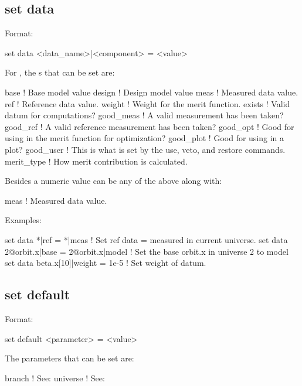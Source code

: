 {{\subsection{set data}
\label{s:set.data}

Format:
\begin{example}
  set data <data_name>|<component> = <value>
\end{example}


For , the s that can be set are:
\begin{example}
  base        ! Base model value
  design      ! Design model value
  meas        ! Measured data value.
  ref         ! Reference data value.
  weight      ! Weight for the merit function.
  exists      ! Valid datum for computations?
  good_meas   ! A valid measurement has been taken?
  good_ref    ! A valid reference measurement has been taken?
  good_opt    ! Good for using in the merit function for optimization?
  good_plot   ! Good for using in a plot?
  good_user   ! This is what is set by the use, veto, and restore commands.
  merit_type  ! How merit contribution is calculated.
\end{example}
Besides a numeric value  can be any of the above along with:
\begin{example}
  meas        ! Measured data value.
\end{example}

Examples:
\begin{example}
  set data *|ref = *|meas            ! Set ref data = measured in current universe.
  set data 2@orbit.x|base = 2@orbit.x|model 
                                     ! Set the base orbit.x in universe 2 to model
  set data beta.x[10]|weight = 1e-5  ! Set weight of datum.
\end{example}


\subsection{set default}
\label{s:set.default}

Format:
\begin{example}
  set default <parameter> = <value>
\end{example}

The parameters that can be set are:
\begin{example}
  branch            ! See: 
  universe          ! See: 
\end{example}

}}
